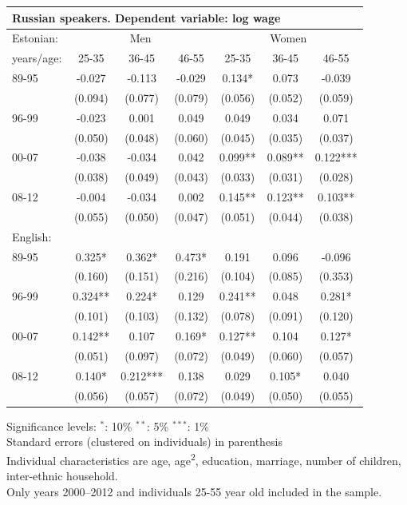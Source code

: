 \documentclass[12pt, a4paper]{article}
\def\tenpc{$^{\ast}$}
\def\fivepc{$^{\ast\ast}$}
\def\onepc{$^{\ast\ast\ast}$}
\newcommand{\legend}{\normalsize{Significance levels:\hspace{1em} \tenpc : 10\% \hspace{1em} \fivepc : 5\% \hspace{1em} \onepc : 1\% \normalsize}}
\newcommand{\modelTwo}{age, age\textsuperscript{2}, education, marriage, number of children, inter-ethnic household}
\newcommand{\restrictions}{Only years 2000--2012 and individuals 25-55
  year old included in the sample.}
\begin{document}
\begin{table}[htbp]
\begin{tabular}{lccc|cc c}
          \midrule
		\multicolumn{7}{l}{Russian speakers. Dependent variable: log wage}\\
		\midrule
		Estonian:&\multicolumn{3}{c|}{Men} &\multicolumn{3}{c}{Women}\\
		years/age: & 25-35   & 36-45    & 46-55   & 25-35   & 36-45   & 46-55    \\
		\midrule
		89-95      & -0.027  & -0.113   & -0.029  & 0.134*  & 0.073   & -0.039   \\
		           & (0.094) & (0.077)  & (0.079) & (0.056) & (0.052) & (0.059)  \\
		96-99      & -0.023  & 0.001    & 0.049   & 0.049   & 0.034   & 0.071    \\
		           & (0.050) & (0.048)  & (0.060) & (0.045) & (0.035) & (0.037)  \\
		00-07      & -0.038  & -0.034   & 0.042   & 0.099** & 0.089** & 0.122*** \\
		           & (0.038) & (0.049)  & (0.043) & (0.033) & (0.031) & (0.028)  \\
		08-12      & -0.004  & -0.034   & 0.002   & 0.145** & 0.123** & 0.103**  \\
		           & (0.055) & (0.050)  & (0.047) & (0.051) & (0.044) & (0.038)  \\ \midrule
		English:   &         &          &         &         &         &          \\
		89-95      & 0.325*  & 0.362*   & 0.473*  & 0.191   & 0.096   & -0.096   \\
		           & (0.160) & (0.151)  & (0.216) & (0.104) & (0.085) & (0.353)  \\
		96-99      & 0.324** & 0.224*   & 0.129   & 0.241** & 0.048   & 0.281*   \\
		           & (0.101) & (0.103)  & (0.132) & (0.078) & (0.091) & (0.120)  \\
		00-07      & 0.142** & 0.107    & 0.169*  & 0.127** & 0.104   & 0.127*   \\
		           & (0.051) & (0.097)  & (0.072) & (0.049) & (0.060) & (0.057)  \\
		08-12      & 0.140*  & 0.212*** & 0.138   & 0.029   & 0.105*  & 0.040    \\
		           & (0.056) & (0.057)  & (0.072) & (0.049) & (0.050) & (0.055)  \\
		\bottomrule
	\end{tabular}
        \begin{flushleft}
          \legend \\ Standard errors (clustered on individuals) in
          parenthesis \\
          Individual characteristics are \modelTwo. \\
          \restrictions
        \end{flushleft}
	\label{tab:age_group_trend}
\end{table}
\end{document}
